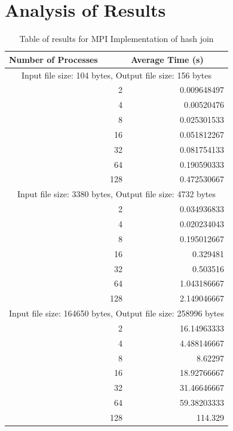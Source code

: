 \documentclass[journal,draftclsnofoot,11pt]{IEEEtran}
\begin{document}
\section{Analysis of Results}\label{ana}
\begin{table}[htbp]
  \centering
  \caption{Table of results for MPI Implementation of hash join}
    \begin{tabular}{|r|r|}
    \hline
    \multicolumn{1}{|l|}{\textbf{Number of Processes}} & \multicolumn{1}{l|}{\textbf{Average Time (s)}} \\
    \hline
    \multicolumn{2}{|c|}{Input file size: 104 bytes, Output file size: 156 bytes} \\
    \hline
    2     & 0.009648497 \\
    \hline
    4     & 0.00520476 \\
    \hline
    8     & 0.025301533 \\
    \hline
    16    & 0.051812267 \\
    \hline
    32    & 0.081754133 \\
    \hline
    64    & 0.190590333 \\
    \hline
    128   & 0.472530667 \\
    \hline
    \multicolumn{2}{|c|}{Input file size: 3380 bytes, Output file size: 4732 bytes} \\
    \hline
    2     & 0.034936833 \\
    \hline
    4     & 0.020234043 \\
    \hline
    8     & 0.195012667 \\
    \hline
    16    & 0.329481 \\
    \hline
    32    & 0.503516 \\
    \hline
    64    & 1.043186667 \\
    \hline
    128   & 2.149046667 \\
    \hline
    \multicolumn{2}{|c|}{Input file size: 164650 bytes, Output file size: 258996 bytes} \\
    \hline
    2     & 16.14963333 \\
    \hline
    4     & 4.488146667 \\
    \hline
    8     & 8.62297 \\
    \hline
    16    & 18.92766667 \\
    \hline
    32    & 31.46646667 \\
    \hline
    64    & 59.38203333 \\
    \hline
    128   & 114.329 \\
    \hline
    \end{tabular}%
  \label{tab:res}%
\end{table}%
\end{document}
